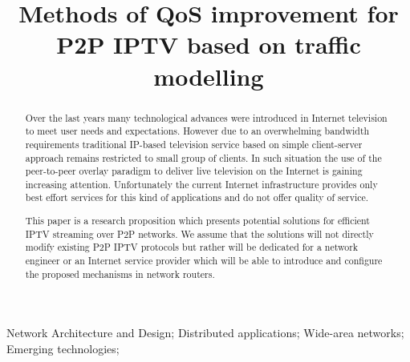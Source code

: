 \documentclass[10pt, conference, compsocconf]{IEEEtran}
\begin{document}
\title{Methods of QoS improvement for P2P IPTV based on traffic modelling}



\author{
}










\maketitle


\begin{abstract}
Over the last years many technological advances were introduced in Internet television to meet user needs and expectations. However due to an overwhelming bandwidth requirements traditional IP-based television service based on simple client-server approach remains restricted to small group of clients. In such situation the use of the peer-to-peer overlay paradigm to deliver live television on the Internet is gaining increasing attention. Unfortunately the current Internet infrastructure provides only best effort services for this kind of applications and do not offer quality of service.

This paper is a research proposition which presents potential solutions for efficient IPTV streaming over P2P networks. We assume that the solutions will not directly modify existing P2P IPTV protocols but rather will be dedicated for a network engineer or an Internet service provider which will be able to introduce and configure the proposed mechanisms in network routers. 

\end{abstract}

\begin{IEEEkeywords}
Network Architecture and Design; Distributed applications; Wide-area networks; Emerging technologies;

\end{IEEEkeywords}


\IEEEpeerreviewmaketitle
\end{document}
